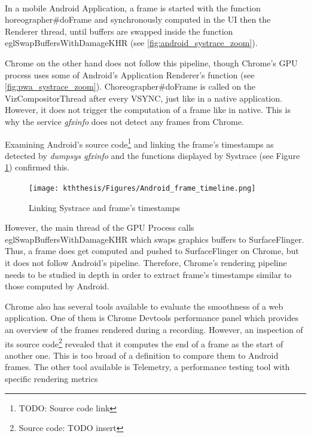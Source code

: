     \paragraph{}
    In a mobile Android Application, a frame is started with the function horeographer\#doFrame and synchronously computed in the UI then the Renderer thread, until buffers are swapped inside the function eglSwapBuffersWithDamageKHR (see \autoref{fig:android_systrace_zoom}).
    
    Chrome on the other hand does not follow this pipeline, though Chrome's GPU process uses some  of Android's Application Renderer's function (see \autoref{fig:pwa_systrace_zoom}). Choreographer\#doFrame is called on the VizCompositorThread after every VSYNC, just like in a native application. However, it does not trigger the computation of a frame like in native. This is  why the service \textit{gfxinfo} does not detect any frames from Chrome. 
    
    Examining Android's source code\footnote{TODO: Source code link} and linking the frame's timestamps as detected by \textit{dumpsys gfxinfo} and the functions displayed by Systrace (see Figure \ref{fig:android_frame_timeline}) confirmed this.
    
    \begin{figure}[!ht]
        \centering
        \texttt{[image: kththesis/Figures/Android\_frame\_timeline.png]}
        \caption{Linking Systrace and frame's timestamps}
        \label{fig:android_frame_timeline}
    \end{figure}
    However, the main thread of the GPU Process calls eglSwapBuffersWithDamageKHR which swaps graphics buffers to SurfaceFlinger. Thus, a frame does get computed and pushed to SurfaceFlinger on Chrome, but it does not follow Android's pipeline. Therefore, Chrome's rendering pipeline needs to be studied in depth in order to extract frame's timestamps similar to those computed by Android. 
    
    
    

Chrome also has several tools available to evaluate the smoothness of a web application. One of them is Chrome Devtools performance panel which provides an overview of the frames rendered during a recording. However, an inspection of its source code\footnote{Source code: TODO insert} revealed that it computes the end of a frame as the start of another one. This is too broad of a definition to compare them to Android frames. \newline
The other tool available is Telemetry, a performance testing tool with specific rendering metrics

